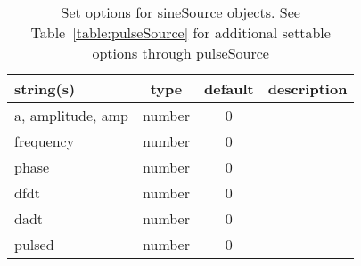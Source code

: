 \begin{table}[ht]
\centering
\begin{tabular}{p{5cm} c c p{7cm}}
\hline
string(s) & type & default & description \\
\hline
a, amplitude, amp & number & 0 & \\
frequency & number & 0 & \\
phase & number & 0 & \\
dfdt & number & 0 & \\
dadt & number & 0 & \\
pulsed & number & 0 & \\
\hline
\end{tabular}
\caption{Set options for sineSource objects. See Table~\ref{table:pulseSource} for additional settable options through pulseSource}
\label{table:sineSource}
\end{table}

